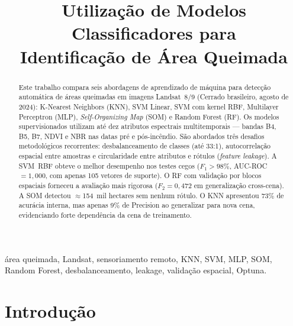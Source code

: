 \documentclass[conference]{IEEEtran}
\begin{document}
\title{Utilização de Modelos Classificadores para\\
Identificação de Área Queimada}

\author{
}

\maketitle

\begin{abstract}
Este trabalho compara seis abordagens de aprendizado de máquina para
detecção automática de áreas queimadas em imagens Landsat~8/9 (Cerrado
brasileiro, agosto de 2024): K-Nearest Neighbors (KNN), SVM Linear,
SVM com kernel RBF, Multilayer Perceptron (MLP), \textit{Self-Organizing
Map} (SOM) e Random Forest (RF). Os modelos supervisionados utilizam
até dez atributos espectrais multitemporais — bandas B4, B5, B7, NDVI e
NBR nas datas pré e pós-incêndio. São abordados três desafios
metodológicos recorrentes: desbalanceamento de classes (até 33:1),
autocorrelação espacial entre amostras e circularidade entre atributos
e rótulos (\textit{feature leakage}). A SVM~RBF obteve o melhor
desempenho nos testes cegos ($F_1 > 98\%$, AUC-ROC~$= 1{,}000$, com
apenas 105 vetores de suporte). O RF com validação por blocos espaciais
forneceu a avaliação mais rigorosa ($F_2 = 0{,}472$ em generalização
cross-cena). A SOM detectou $\approx$154~mil hectares sem nenhum rótulo.
O KNN apresentou 73\% de acurácia interna, mas apenas 9\% de Precision
ao generalizar para nova cena, evidenciando forte dependência da cena
de treinamento.
\end{abstract}

\begin{IEEEkeywords}
área queimada, Landsat, sensoriamento remoto, KNN, SVM, MLP, SOM,
Random Forest, desbalanceamento, leakage, validação espacial, Optuna.
\end{IEEEkeywords}

\section{Introdução}
\end{document}
